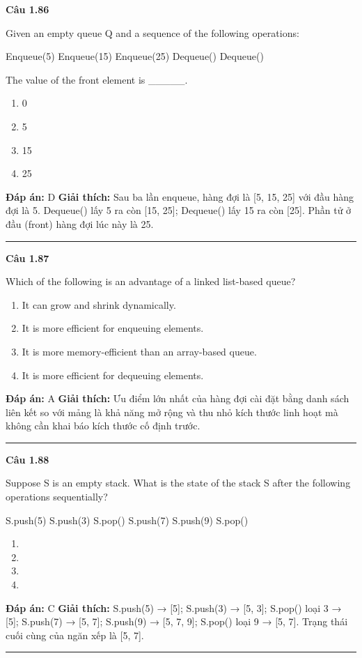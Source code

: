 \documentclass[11pt,a4paper]{article}
\newenvironment{question}[1]{%
  \par\vspace{1em}\noindent\textbf{\large Câu #1}\par\vspace{0.4em}
}{%
  \par\vspace{1em}\hrule\vspace{0.6em}
}
\newenvironment{choices}{%
  \begin{enumerate}[label=\textbf{\Alph*.},leftmargin=2.2em,itemsep=2pt,topsep=3pt]
}{%
  \end{enumerate}
}
\newcommand{\choice}{\item}
\newenvironment{codebox}{%
  \begin{tcolorbox}[colback=gray!8!white,colframe=gray!50!black,arc=1.5mm,boxrule=0.6pt,left=3mm,right=3mm,top=2.5mm,bottom=2.5mm]
  \ttfamily\small
}{%
  \end{tcolorbox}
}
\begin{document}
\begin{question}{1.86}
Given an empty queue Q and a sequence of the following operations:
\begin{codebox}
Enqueue(5)
Enqueue(15)
Enqueue(25)
Dequeue()
Dequeue()
\end{codebox}
The value of the front element is \_\_\_\_\_.
\begin{choices}
\choice 0
\choice 5
\choice 15
\choice 25
\end{choices}
\textbf{Đáp án:} D
\textbf{Giải thích:} Sau ba lần enqueue, hàng đợi là [5, 15, 25] với đầu hàng đợi là 5. Dequeue() lấy 5 ra còn [15, 25]; Dequeue() lấy 15 ra còn [25]. Phần tử ở đầu (front) hàng đợi lúc này là 25.
\end{question}

\begin{question}{1.87}
Which of the following is an advantage of a linked list-based queue?
\begin{choices}
\choice It can grow and shrink dynamically.
\choice It is more efficient for enqueuing elements.
\choice It is more memory-efficient than an array-based queue.
\choice It is more efficient for dequeuing elements.
\end{choices}
\textbf{Đáp án:} A
\textbf{Giải thích:} Ưu điểm lớn nhất của hàng đợi cài đặt bằng danh sách liên kết so với mảng là khả năng mở rộng và thu nhỏ kích thước linh hoạt mà không cần khai báo kích thước cố định trước.
\end{question}

\begin{question}{1.88}
Suppose S is an empty stack. What is the state of the stack S after the following operations sequentially?
\begin{codebox}
S.push(5)
S.push(3)
S.pop()
S.push(7)
S.push(9)
S.pop()
\end{codebox}
\begin{choices}
\choice [5, 3, 7]
\choice [7, 9]
\choice [5, 7]
\choice [7]
\end{choices}
\textbf{Đáp án:} C
\textbf{Giải thích:} S.push(5) → [5]; S.push(3) → [5, 3]; S.pop() loại 3 → [5]; S.push(7) → [5, 7]; S.push(9) → [5, 7, 9]; S.pop() loại 9 → [5, 7]. Trạng thái cuối cùng của ngăn xếp là [5, 7].
\end{question}
\end{document}
